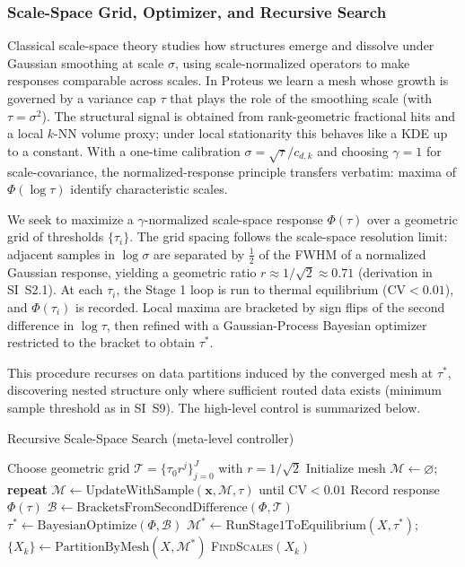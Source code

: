 \documentclass[11pt]{article}
\begin{document}
\subsubsection{Scale-Space Grid, Optimizer, and Recursive Search}
Classical scale-space theory studies how structures emerge and dissolve under Gaussian smoothing at scale $\sigma$, using scale-normalized operators to make responses comparable across scales. In Proteus we learn a mesh whose growth is governed by a variance cap $\tau$ that plays the role of the smoothing scale (with $\tau{=}\sigma^2$). The structural signal is obtained from rank-geometric fractional hits and a local $k$-NN volume proxy; under local stationarity this behaves like a KDE up to a constant. With a one-time calibration $\sigma = \sqrt{\tau}/c_{d,k}$ and choosing $\gamma{=}1$ for scale-covariance, the normalized-response principle transfers verbatim: maxima of $\Phi(\log\tau)$ identify characteristic scales.

We seek to maximize a $\gamma$-normalized scale-space response $\Phi(\tau)$ over a geometric grid of thresholds $\{\tau_i\}$. The grid spacing follows the scale-space resolution limit: adjacent samples in $\log\sigma$ are separated by $\tfrac{1}{2}$ of the FWHM of a normalized Gaussian response, yielding a geometric ratio $r \approx 1/\sqrt{2} \approx 0.71$ (derivation in SI~S2.1). At each $\tau_i$, the Stage 1 loop is run to thermal equilibrium (CV$<0.01$), and $\Phi(\tau_i)$ is recorded. Local maxima are bracketed by sign flips of the second difference in $\log\tau$, then refined with a Gaussian-Process Bayesian optimizer restricted to the bracket to obtain $\tau^*$.

This procedure recurses on data partitions induced by the converged mesh at $\tau^*$, discovering nested structure only where sufficient routed data exists (minimum sample threshold as in SI~S9). The high-level control is summarized below.

\begin{algorithm}[h]
\caption{Recursive Scale-Space Search (meta-level controller)}
\label{alg:scalesearch}
\begin{algorithmic}[1]
    \State Choose geometric grid $\mathcal T = \{\tau_0 r^j\}_{j=0}^{J}$ with $r{=}1/\sqrt{2}$
        \State Initialize mesh $\mathcal M\leftarrow \varnothing$; \textbf{repeat} $\mathcal M \gets \text{UpdateWithSample}(\mathbf x, \mathcal M, \tau)$ until CV$<0.01$
        \State Record response $\Phi(\tau)$
    \EndFor
    \State $\mathcal B \gets \text{BracketsFromSecondDifference}(\Phi,\mathcal T)$
    \State $\tau^* \gets \text{BayesianOptimize}(\Phi, \mathcal B)$
    \State $\mathcal M^* \gets \text{RunStage1ToEquilibrium}(X, \tau^*)$; $\{X_k\} \gets \text{PartitionByMesh}(X, \mathcal M^*)$
            \State \textsc{FindScales}$(X_k)$ 
        \EndIf
    \EndFor
\EndProcedure
\end{algorithmic}
\end{algorithm}
\end{document}
